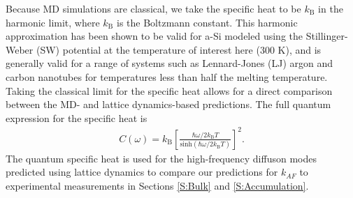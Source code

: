 \documentclass[aps,prb,onecolumn,preprint,superscriptaddress,footinbib,amsmath,amssymb,floatfix]{revtex4}
\begin{document}
Because MD simulations are classical,\cite{mcquarrie_statistical_2000} 
we take the specific heat to be $k_{\text{B}}$ in the 
harmonic limit, where $k_{\text{B}}$ is the Boltzmann constant. 
This harmonic approximation has been shown to be valid 
for a-Si modeled using the Stillinger-Weber (SW) potential at the temperature 
of interest here (300 K),\cite{feldman_thermal_1993} and is generally 
valid for a range of systems such as 
Lennard-Jones (LJ) argon\cite{mcgaughey_quantitative_2004} 
and carbon nanotubes\cite{larkin_comparison_2012} for temperatures less 
than half the melting temperature. 
Taking the classical limit for the specific heat allows for a direct 
comparison between the MD- and lattice dynamics-based 
predictions. 
The full quantum expression for the specific heat is
\cite{ziman_electrons_2001}
\begin{equation}\label{EQ:Cquantum}
\begin{split}
C(\omega) = k_{\text{B}}\left[\frac{\hbar\omega/2k_{\text{B}}T}
{\text{sinh}(\hbar\omega/2k_{\text{B}}T)}\right]^2.
\end{split}
\end{equation} 
The quantum specific heat is used for the high-frequency 
diffuson modes 
predicted using lattice dynamics to compare our predictions 
for $k_{AF}$ to experimental measurements in Sections 
\ref{S:Bulk} and \ref{S:Accumulation}. 
\end{document}
